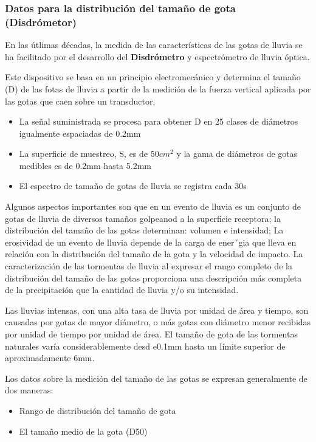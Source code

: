     \subsubsection{Datos para la distribución del tamaño de gota (Disdrómetor)}
    En las útlimas décadas, la medida de las características de las gotas de lluvia se ha facilitado por el desarrollo del \textbf{Disdrómetro} y espectrómetro de lluvia óptica.
    
    Este dispositivo se basa en un principio electromecánico y determina el tamaño (D) de las fotas de lluvia a partir de la medición de la fuerza vertical aplicada por las gotas que caen sobre un transductor.
    \begin{itemize}
        \item La señal suministrada se procesa para obtener D en 25 clases de diámetros igualmente espaciadas de 0.2mm
        \item La superficie de muestreo, S, es de $50cm^2$ y la gama de diámetros de gotas medibles es de 0.2mm hasta 5.2mm
        \item El espectro de tamaño de gotas de lluvia se registra cada 30s
    \end{itemize}
    Algunos aspectos importantes son que en un evento de lluvia es un conjunto de gotas de lluvia de diversos tamaños golpeanod a la superficie receptora; la distribución del tamaño de las gotas determinan: volumen e intensidad; La erosividad de un evento de lluvia depende de la carga de ener´gia que lleva en relación con la distribución del tamaño de la gota y la velocidad de impacto. La caracterización de las tormentas de lluvia al expresar el rango completo de la distribución del tamaño de las gotas proporciona una descripción más completa de la precipitación que la cantidad de lluvia y/o su intensidad.
    
    Las lluvias intensas, con una alta tasa de lluvia por unidad de área y tiempo, son causadas por gotas de mayor diámetro, o más gotas con diámetro menor recibidas por unidad de tiempo por unidad de área.
    El tamaño de gota de las tormentas naturales varía considerablemente desd e0.1mm hasta un límite superior de aproximadamente 6mm.

    Los datos sobre la medición del tamaño de las gotas se expresan generalmente de dos maneras:
    \begin{itemize}
        \item Rango de distribución del tamaño de gota
        \item El tamaño medio de la gota (D50)
    \end{itemize}
    
